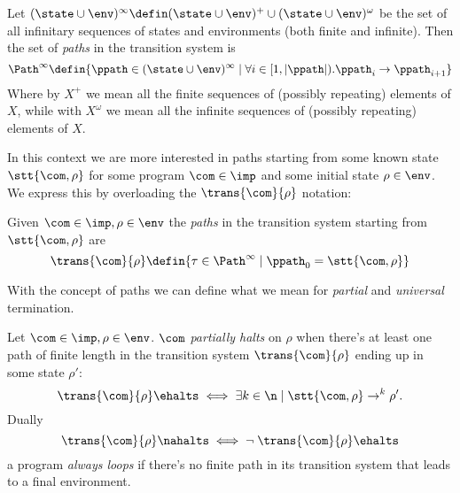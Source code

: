 \begin{definition}[Paths]
  Let \((\state \cup \env)^\infty \defin (\state \cup \env)^+ \cup
  (\state \cup \env)^\omega\) be the set of all infinitary sequences
  of states and environments (both finite and infinite). Then the set
  of \emph{paths} in the transition system is
  \begin{equation*}
    \Path^\infty \defin
    \{\ppath \in (\state \cup \env)^\infty \mid \forall i \in [ 1, |
    \ppath | ) . \ppath_i \to \ppath_{i+1}\}
  \end{equation*}
  Where by \(X^+\) we mean all the finite sequences of (possibly
  repeating) elements of \(X\), while with \(X^\omega\) we mean all
  the infinite sequences of (possibly repeating) elements of \(X\).

\end{definition}
\noindent
In this context we are more interested in paths starting from some
known state \(\stt{\com, \rho}\) for some program \(\com\in\imp\) and
some initial state \(\rho \in \env\). We express this by overloading
the \(\trans{\com}{\rho}\) notation:
\begin{definition}
  Given \(\com \in \imp, \rho\in\env\) the \emph{paths} in the
  transition system starting from \(\stt{\com, \rho}\)
  are \[\trans{\com}{\rho} \defin \{\tau \in \Path^\infty \mid
  \ppath_0 = \stt{\com, \rho}\}\]
\end{definition}
\noindent
With the concept of paths we can define what we mean for
\emph{partial} and \emph{universal} termination.
\begin{definition}
  Let \(\com \in \imp, \rho \in \env\). \(\com\) \emph{partially
    halts} on \(\rho\) when there's at least one path of finite length
  in the transition system \(\trans{\com}{\rho}\) ending up in some
  state \(\rho'\):
  \[ \trans{\com}{\rho} \ehalts \iff \exists k \in \n \mid \stt{\com,
      \rho} \to^k \rho'.\] Dually
  \[ \trans{\com}{\rho} \nahalts \iff \neg \; \trans{\com}{\rho}
    \ehalts \] a program \emph{always loops} if there's no finite path
  in its transition system that leads to a final environment.
\end{definition}
